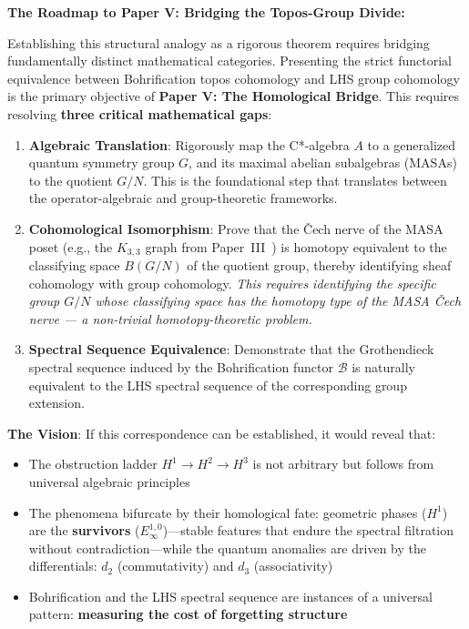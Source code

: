 \documentclass[11pt]{article}
\providecommand{\tightlist}{%
  \setlength{\itemsep}{0pt}\setlength{\parskip}{0pt}}
\begin{document}
\textbf{The Roadmap to Paper V: Bridging the Topos-Group Divide:}

Establishing this structural analogy as a rigorous theorem requires bridging fundamentally distinct mathematical categories. Presenting the strict functorial equivalence between Bohrification topos cohomology and LHS group cohomology is the primary objective of \textbf{Paper V: The Homological Bridge}. This requires resolving \textbf{three critical mathematical gaps}:

\begin{enumerate}
\def\labelenumi{\arabic{enumi}.}
\item
  \textbf{Algebraic Translation}: Rigorously map the C*-algebra \(A\) to a generalized quantum symmetry group \(G\), and its maximal abelian subalgebras (MASAs) to the quotient \(G/N\). This is the foundational step that translates between the operator-algebraic and group-theoretic frameworks.
\item
  \textbf{Cohomological Isomorphism}: Prove that the Čech nerve of the MASA poset (e.g., the \(K_{3,3}\) graph from Paper~III~\cite{PaperIII}) is homotopy equivalent to the classifying space \(B(G/N)\) of the quotient group, thereby identifying sheaf cohomology with group cohomology. \emph{This requires identifying the specific group \(G/N\) whose classifying space has the homotopy type of the MASA Čech nerve --- a non-trivial homotopy-theoretic problem.}
\item
  \textbf{Spectral Sequence Equivalence}: Demonstrate that the Grothendieck spectral sequence induced by the Bohrification functor \(\mathcal{B}\) is naturally equivalent to the LHS spectral sequence of the corresponding group extension.
\end{enumerate}

\textbf{The Vision}: If this correspondence can be established, it would reveal that:

\begin{itemize}
\tightlist
\item
  The obstruction ladder \(H^1 \to H^2 \to H^3\) is not arbitrary but follows from universal algebraic principles
\item
  The phenomena bifurcate by their homological fate: geometric phases ($H^1$) are the \textbf{survivors} ($E_\infty^{1,0}$)---stable features that endure the spectral filtration without contradiction---while the quantum anomalies are driven by the differentials: $d_2$ (commutativity) and $d_3$ (associativity)
\item
  Bohrification and the LHS spectral sequence are instances of a universal pattern: \textbf{measuring the cost of forgetting structure}
\end{itemize}
\end{document}
